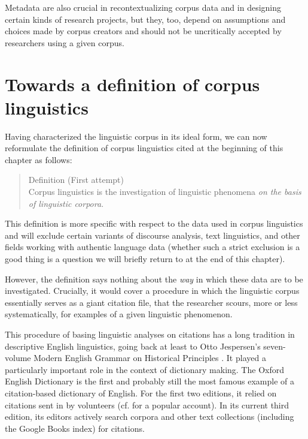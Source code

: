 Metadata  are also crucial in recontextualizing corpus data and in designing  certain kinds of research projects, but they, too, depend on assumptions and choices made by corpus creators and should not be uncritically accepted by researchers using a given corpus.

\section{Towards a definition of corpus linguistics}
\label{sec:corpusdefinition}

Having characterized the linguistic corpus in its ideal form, we can now reformulate the definition of corpus linguistics cited at the beginning of this chapter as follows:

\begin{quotation}
Definition (First attempt) \\
Corpus linguistics is the investigation of linguistic phenomena \emph{on the basis of linguistic corpora}.
\end{quotation}

This definition is more specific with respect to the data used in corpus linguistics and will exclude certain variants of discourse analysis, text linguistics, and other fields working with authentic  language data (whether such a strict exclusion is a good thing is a question we will briefly return to at the end of this chapter).

However, the definition says nothing about the \emph{way} in which these data are to be investigated. Crucially, it would cover a procedure in which the linguistic corpus essentially serves as a giant citation file, that the researcher scours, more or less systematically, for examples of a given linguistic phenomenon.

This procedure of basing linguistic analyses on citations has a long tradition in descriptive  English linguistics, going back at least to Otto Jespersen's seven\hyp{}volume Modern English Grammar on Historical Principles \citep{jespersen_modern_1909}. It played a particularly important role in the context of dictionary  making. The Oxford English Dictionary  \citep{simpson_oxford_1989} is the first and probably still the most famous example of a citation\hyp{}based dictionary  of English. For the first two editions, it relied on citations sent in by volunteers (cf. \citealt{winchester_meaning_2003} for a popular account). In its current third edition, its editors actively search corpora and other text collections (including the Google Books index) for citations.


